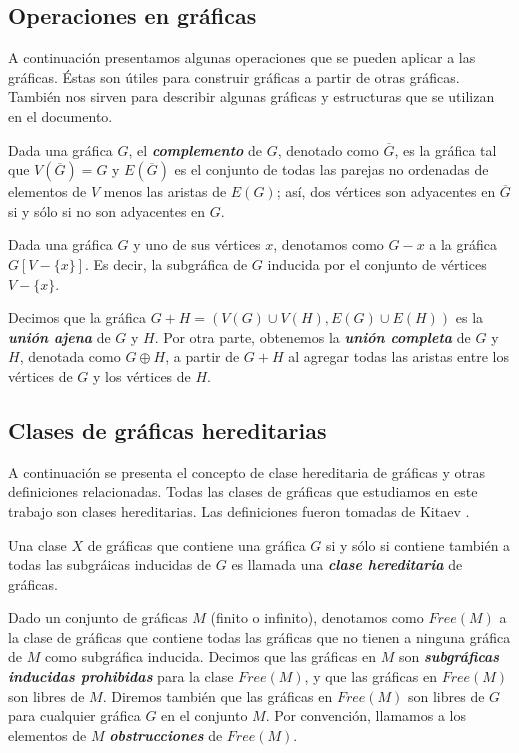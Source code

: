 \subsection{Operaciones en gráficas}

A continuación presentamos algunas operaciones que se pueden aplicar a las gráficas. Éstas son útiles para construir gráficas a partir de otras gráficas. También nos sirven para describir algunas gráficas y estructuras que se utilizan en el documento.

Dada una gráfica $G$, el \textbf{\emph{complemento}} de $G$, denotado como $\overline{G}$, es la gráfica tal que $V(\overline{G}) = G$ y $E(\overline{G})$ es el conjunto de todas las parejas no ordenadas de elementos de $V$ menos las aristas de $E(G)$; así, dos vértices son adyacentes en $\overline{G}$ si y sólo si no son adyacentes en $G$.

 Dada una gráfica $G$ y uno de sus vértices $x$, denotamos como $G - x $ a la gráfica $G[V-\{x\}]$. Es decir, la subgráfica de $G$ inducida por el conjunto de vértices $V-\{x\}$.

Decimos que la gráfica $G + H = (V(G)\cup V(H), E(G)\cup E(H))$ es la \textbf{\emph{unión ajena}} de $G$ y $H$. Por otra parte, obtenemos la \textbf{\emph{unión completa}} de $G$ y $H$, denotada como $G \oplus H$, a partir de $G + H$ al agregar todas las aristas entre los vértices de $G$ y los vértices de $H$.

\subsection{Clases de gráficas hereditarias}

A continuación se presenta el concepto de clase hereditaria de gráficas y otras definiciones relacionadas. Todas las clases de gráficas que estudiamos en este trabajo son clases hereditarias.  Las definiciones fueron tomadas de Kitaev \cite{Kitaev}.

Una clase $X$ de gráficas que contiene una gráfica $G$ si y sólo si contiene también a todas las subgráicas inducidas de $G$ es llamada una \textbf{\emph{clase hereditaria}} de gráficas.

Dado un conjunto de gráficas $M$ (finito o infinito), denotamos como $Free(M)$ a la clase de gráficas que contiene todas las gráficas que no tienen a ninguna gráfica de $M$ como subgráfica inducida. Decimos que las gráficas en $M$ son \textbf{\emph{subgráficas inducidas prohibidas}} para la clase $Free(M)$, y que las gráficas en $Free(M)$ son libres de $M$. Diremos también que las gráficas en $Free(M)$ son libres de $G$ para cualquier gráfica $G$ en el conjunto $M$. Por convención, llamamos a los elementos de $M$ \textbf{\emph{obstrucciones}} de $Free(M)$.

